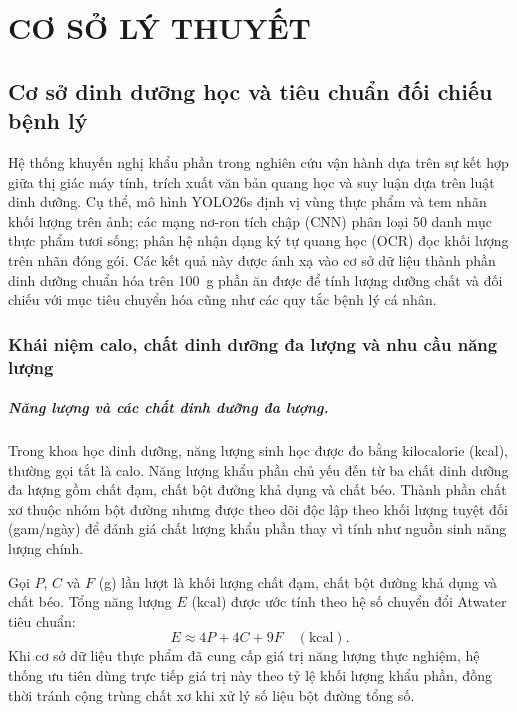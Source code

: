 \chapter{CƠ SỞ LÝ THUYẾT}
\section{Cơ sở dinh dưỡng học và tiêu chuẩn đối chiếu bệnh lý}
\label{sec:nutrition-foundation}

Hệ thống khuyến nghị khẩu phần trong nghiên cứu vận hành dựa trên sự kết hợp giữa thị giác máy tính, trích xuất văn bản quang học và suy luận dựa trên luật dinh dưỡng. Cụ thể, mô hình YOLO26s định vị vùng thực phẩm và tem nhãn khối lượng trên ảnh; các mạng nơ-ron tích chập (CNN) phân loại 50 danh mục thực phẩm tươi sống; phân hệ nhận dạng ký tự quang học (OCR) đọc khối lượng trên nhãn đóng gói. Các kết quả này được ánh xạ vào cơ sở dữ liệu thành phần dinh dưỡng chuẩn hóa trên 100~g phần ăn được để tính lượng dưỡng chất và đối chiếu với mục tiêu chuyển hóa cũng như các quy tắc bệnh lý cá nhân.

\subsection{Khái niệm calo, chất dinh dưỡng đa lượng và nhu cầu năng lượng}
\label{subsec:energy-nutrients}

\paragraph{Năng lượng và các chất dinh dưỡng đa lượng.}
Trong khoa học dinh dưỡng, năng lượng sinh học được đo bằng kilocalorie (kcal), thường gọi tắt là calo. Năng lượng khẩu phần chủ yếu đến từ ba chất dinh dưỡng đa lượng gồm chất đạm, chất bột đường khả dụng và chất béo. Thành phần chất xơ thuộc nhóm bột đường nhưng được theo dõi độc lập theo khối lượng tuyệt đối (gam/ngày) để đánh giá chất lượng khẩu phần thay vì tính như nguồn sinh năng lượng chính.

Gọi $P$, $C$ và $F$ (g) lần lượt là khối lượng chất đạm, chất bột đường khả dụng và chất béo. Tổng năng lượng $E$ (kcal) được ước tính theo hệ số chuyển đổi Atwater tiêu chuẩn:
\begin{equation}
    E \approx 4P + 4C + 9F \quad (\mathrm{kcal}).
    \label{eq:atwater-energy}
\end{equation}
Khi cơ sở dữ liệu thực phẩm đã cung cấp giá trị năng lượng thực nghiệm, hệ thống ưu tiên dùng trực tiếp giá trị này theo tỷ lệ khối lượng khẩu phần, đồng thời tránh cộng trùng chất xơ khi xử lý số liệu bột đường tổng số.

